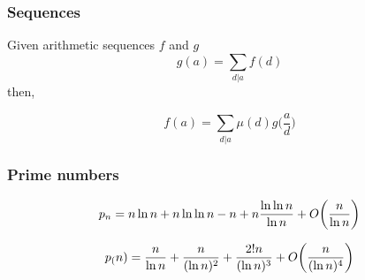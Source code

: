 \subsubsection{Sequences}
Given arithmetic sequences $f$ and $g$
\[g(a) = \sum_{d \vert a} f(d)\]
then,

\[f(a) = \sum_{d \vert a} \mu(d) g \bigg( \frac{a}{d} \bigg) \]


\subsubsection{Prime numbers}


\[p_{n}  = n \ln n + n \ln \ln n - n + n {\ln \ln n \over \ln n}
+ O\bigg({n \over \ln n}\bigg)\]

\[ p_(n) = {n \over \ln n} + {n \over (\ln n)^2} + {2! n \over (\ln n)^3} \\+ O\bigg({n \over (\ln n)^4}\bigg)\]
